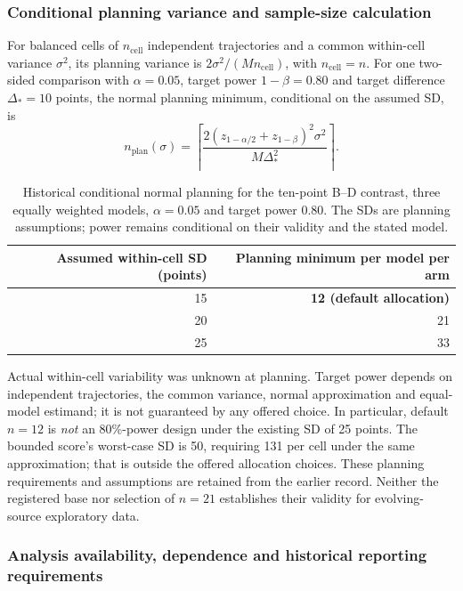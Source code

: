 \subsubsection{Conditional planning variance and sample-size calculation}

For balanced cells of $n_{\mathrm{cell}}$ independent trajectories and a
common within-cell variance $\sigma^2$, its planning variance is
$2\sigma^2/(M n_{\mathrm{cell}})$, with $n_{\mathrm{cell}}=n$.
For one two-sided comparison with $\alpha=0.05$, target power
$1-\beta=0.80$ and target difference $\Delta_*=10$ points, the normal
planning minimum, conditional on the assumed SD, is
\begin{equation}
n_{\mathrm{plan}}(\sigma)=
\left\lceil\frac{2{(z_{1-\alpha/2}+z_{1-\beta})}^2\sigma^2}
{M\Delta_*^2}\right\rceil.
\label{eq:samplesize}
\end{equation}

\begin{table}[!htbp]
\centering\small
\caption{Historical conditional normal planning for the ten-point B--D contrast,
three equally weighted models, $\alpha=0.05$ and target power 0.80.
The SDs are planning assumptions; power remains conditional on their
validity and the stated model.}\label{tab:replicationchoices}

\begin{tabular}{@{}rr@{}}
\toprule
Assumed within-cell SD (points) & Planning minimum per model per arm \\
\midrule
15 & \textbf{12 (default allocation)} \\
20 & 21 \\
25 & 33 \\
\bottomrule
\end{tabular}
\end{table}

Actual within-cell variability was unknown at planning. Target power
depends on independent trajectories,
the common variance, normal approximation and equal-model estimand; it is
not guaranteed by any offered choice. In particular, default $n=12$ is
\emph{not} an 80\%-power design under the existing SD of 25 points.
The bounded score's worst-case SD is 50, requiring 131 per cell under
the same approximation; that is outside the offered allocation choices.
These planning requirements and assumptions are retained from the earlier
record. Neither the registered base nor selection of $n=21$ establishes
their validity for evolving-source exploratory data.

\subsubsection{Analysis availability, dependence and historical reporting requirements}

